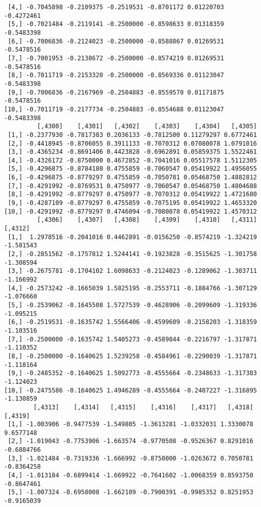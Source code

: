 \documentclass[
  letterpaper,
  DIV=11,
  numbers=noendperiod]{scrreprt}
\begin{document}
\begin{verbatim}
 [4,] -0.7045898 -0.2109375 -0.2519531 -0.8701172 0.01220703 -0.4272461
 [5,] -0.7021484 -0.2119141 -0.2500000 -0.8598633 0.01318359 -0.5483398
 [6,] -0.7006836 -0.2124023 -0.2500000 -0.8588867 0.01269531 -0.5478516
 [7,] -0.7001953 -0.2138672 -0.2500000 -0.8574219 0.01269531 -0.5478516
 [8,] -0.7011719 -0.2153320 -0.2500000 -0.8569336 0.01123047 -0.5483398
 [9,] -0.7006836 -0.2167969 -0.2504883 -0.8559570 0.01171875 -0.5478516
[10,] -0.7011719 -0.2177734 -0.2504883 -0.8554688 0.01123047 -0.5483398
         [,4300]    [,4301]   [,4302]    [,4303]    [,4304]   [,4305]
 [1,] -0.2377930 -0.7817383 0.2036133 -0.7812500 0.11279297 0.6772461
 [2,] -0.4418945 -0.8706055 0.3911133 -0.7070312 0.07080078 1.0791016
 [3,] -0.4365234 -0.8691406 0.4423828 -0.6962891 0.05859375 1.5522461
 [4,] -0.4326172 -0.8750000 0.4672852 -0.7041016 0.05517578 1.5112305
 [5,] -0.4296875 -0.8784180 0.4755859 -0.7060547 0.05419922 1.4956055
 [6,] -0.4296875 -0.8779297 0.4755859 -0.7050781 0.05468750 1.4882812
 [7,] -0.4291992 -0.8769531 0.4750977 -0.7060547 0.05468750 1.4804688
 [8,] -0.4291992 -0.8779297 0.4750977 -0.7070312 0.05419922 1.4721680
 [9,] -0.4287109 -0.8779297 0.4755859 -0.7075195 0.05419922 1.4653320
[10,] -0.4291992 -0.8779297 0.4746094 -0.7080078 0.05419922 1.4570312
         [,4306]    [,4307]   [,4308]    [,4309]    [,4310]   [,4311]   [,4312]
 [1,]  1.2978516 -0.2041016 0.4462891 -0.0156250 -0.8574219 -1.324219 -1.581543
 [2,] -0.2851562 -0.1757812 1.5244141 -0.1923828 -0.3515625 -1.301758 -1.308594
 [3,] -0.2675781 -0.1704102 1.6098633 -0.2124023 -0.1289062 -1.303711 -1.166992
 [4,] -0.2573242 -0.1665039 1.5825195 -0.2553711 -0.1884766 -1.307129 -1.076660
 [5,] -0.2539062 -0.1645508 1.5727539 -0.4628906 -0.2099609 -1.319336 -1.095215
 [6,] -0.2519531 -0.1635742 1.5566406 -0.4599609 -0.2158203 -1.318359 -1.103516
 [7,] -0.2500000 -0.1635742 1.5405273 -0.4589844 -0.2216797 -1.317871 -1.110352
 [8,] -0.2500000 -0.1640625 1.5239258 -0.4584961 -0.2290039 -1.317871 -1.118164
 [9,] -0.2485352 -0.1640625 1.5092773 -0.4555664 -0.2348633 -1.317383 -1.124023
[10,] -0.2475586 -0.1640625 1.4946289 -0.4555664 -0.2407227 -1.316895 -1.130859
        [,4313]    [,4314]   [,4315]    [,4316]    [,4317]   [,4318]    [,4319]
 [1,] -1.003906 -0.9477539 -1.549805 -1.3613281 -1.0332031 1.3330078  9.6577148
 [2,] -1.019043 -0.7753906 -1.663574 -0.9770508 -0.9526367 0.8291016 -0.6884766
 [3,] -1.021484 -0.7319336 -1.666992 -0.8750000 -1.0263672 0.7050781 -0.8364258
 [4,] -1.013184 -0.6899414 -1.669922 -0.7641602 -1.0068359 0.8593750 -0.8647461
 [5,] -1.007324 -0.6958008 -1.662109 -0.7900391 -0.9985352 0.8251953 -0.9165039

\end{verbatim}
\end{document}
